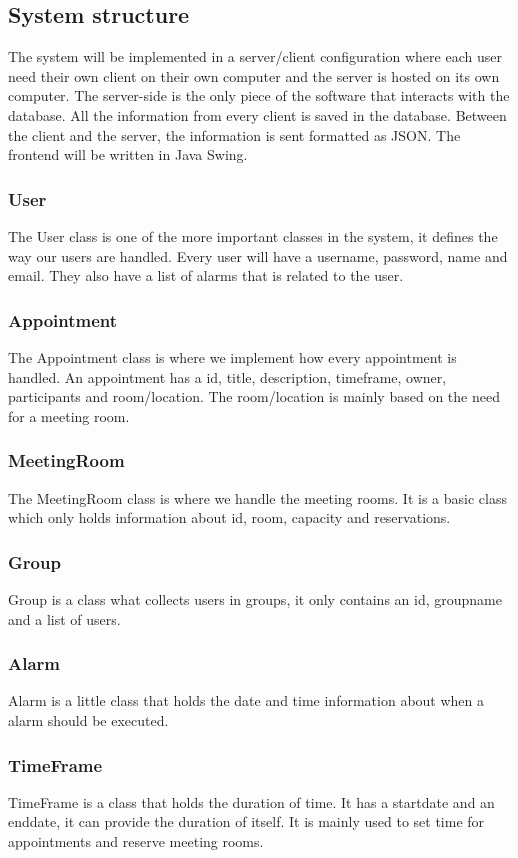 \subsection{System structure}
The system will be implemented in a server/client configuration where each user need their own client on their own computer and the server is hosted on its own computer. The server-side is the only piece of the software that interacts with the database. All the information from every client is saved in the database. Between the client and the server, the information is sent formatted as JSON. The frontend will be written in Java Swing.

\subsubsection{User}
The User class is one of the more important classes in the system, it defines the way our users are handled. Every user will have a username, password, name and email. They also have a list of alarms that is related to the user.

\subsubsection{Appointment}
The Appointment class is where we implement how every appointment is handled. An appointment has a id, title, description, timeframe, owner, participants and room/location. The room/location is mainly based on the need for a meeting room.

\subsubsection{MeetingRoom}
The MeetingRoom class is where we handle the meeting rooms. It is a basic class which only holds information about id, room, capacity and reservations.

\subsubsection{Group}
Group is a class what collects users in groups, it only contains an id, groupname and a list of users.

\subsubsection{Alarm}
Alarm is a little class that holds the date and time information about when a alarm should be executed.

\subsubsection{TimeFrame}
TimeFrame is a class that holds the duration of time. It has a startdate and an enddate, it can provide the duration of itself. It is mainly used to set time for appointments and reserve meeting rooms.



